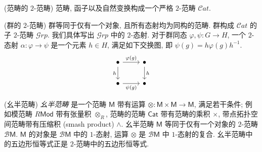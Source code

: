 \begin{example}
	{(范畴的 $2$-范畴)}
	范畴, 函子以及自然变换构成一个严格 $2$-范畴 $\mathcal Cat$.
\end{example}

\begin{example}
	{(群的 $2$-范畴)}
	群等同于仅有一个对象, 且所有态射均为同构的范畴. 群构成 $\mathcal Cat$ 的子 $2$-范畴 $\mathcal Grp$.
	我们具体写出 $\mathcal Grp$ 中的 $2$-态射. 对于群同态 $\varphi,\psi\colon G\to H$,
	一个 $2$-态射 $\alpha\colon \varphi\to\psi$ 是一个元素 $h\in H$,
	满足如下交换图, 即 $\psi(g) = h\varphi(g)h^{-1}$.
	$$\begin{tikzcd}[ampersand replacement=\&]
		\bullet \& \bullet \\
		\bullet \& \bullet
		\arrow["h"', from=1-1, to=2-1]
		\arrow["{\varphi(g)}", from=1-1, to=1-2]
		\arrow["h", from=1-2, to=2-2]
		\arrow["{\psi(g)}"', from=2-1, to=2-2]
	\end{tikzcd}$$
\end{example}

\begin{example}
	{(幺半范畴)}
	\emph{幺半范畴} 是一个范畴 $\mathsf M$ 带有运算 $\otimes\colon \mathsf M\times\mathsf M\to\mathsf M$, 满足若干条件; 例如模范畴 $R\mathsf {Mod}$ 带有张量积 $\otimes_R$, 范畴的范畴 $\mathsf {Cat}$ 带有范畴的乘积 $\times$, 带点拓扑空间范畴带有压缩积 (smash product) $\wedge$. 幺半范畴 $\mathsf M$ 等同于仅有一个对象的 $2$-范畴 $\mathcal B\mathsf M$.
	$\mathsf M$ 的对象是 $\mathcal B\mathsf M$ 中的 $1$-态射, 运算 $\otimes$ 是 $\mathcal B\mathsf M$ 中 $1$-态射的复合. 幺半范畴中的五边形恒等式正是 $2$-范畴中的五边形恒等式.
\end{example}

